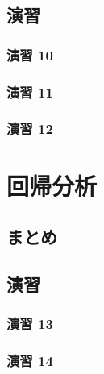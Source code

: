 \documentclass[
  12pt,
]{book}
\begin{document}
\hypertarget{ux6f14ux7fd2-10}{%
\subsection{演習}\label{ux6f14ux7fd2-10}}

\hypertarget{ux6f14ux7fd2-10-1}{%
\subsubsection*{演習 10}\label{ux6f14ux7fd2-10-1}}

\hypertarget{ux6f14ux7fd2-11}{%
\subsubsection*{演習 11}\label{ux6f14ux7fd2-11}}

\hypertarget{ux6f14ux7fd2-12}{%
\subsubsection*{演習 12}\label{ux6f14ux7fd2-12}}

\hypertarget{ux56deux5e30ux5206ux6790}{%
\section{回帰分析}\label{ux56deux5e30ux5206ux6790}}

\hypertarget{ux307eux3068ux3081-5}{%
\subsection{まとめ}\label{ux307eux3068ux3081-5}}

\hypertarget{ux6f14ux7fd2-13}{%
\subsection{演習}\label{ux6f14ux7fd2-13}}

\hypertarget{ux6f14ux7fd2-13-1}{%
\subsubsection*{演習 13}\label{ux6f14ux7fd2-13-1}}

\hypertarget{ux6f14ux7fd2-14}{%
\subsubsection*{演習 14}\label{ux6f14ux7fd2-14}}
\end{document}
